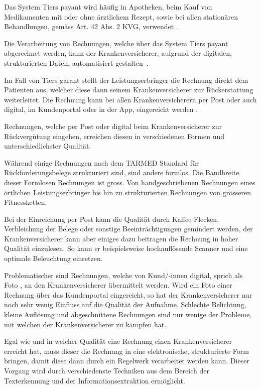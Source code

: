 Das System Tiers payant wird häufig in Apotheken, beim Kauf von Medikamenten mit oder ohne ärztlichem Rezept, sowie bei allen stationären Behandlungen, gemäss Art. 42 Abs. 2 KVG, verwendet \autocite{EDI2017}.

Die Verarbeitung von Rechnungen, welche über das System Tiers payant abgerechnet werden, kann der Krankenversicherer, aufgrund der digitalen, strukturierten Daten, automatisiert gestalten~\autocite{BAG2016}.

Im Fall von Tiers garant stellt der Leistungserbringer die Rechnung direkt dem Patienten aus, welcher diese dann seinem Krankenversicherer zur Rückerstattung weiterleitet. Die Rechnung kann bei allen Krankenversicherern per Post oder auch digital, im Kundenportal oder in der App, eingereicht werden \autocite{EDI2017}.

Rechnungen, welche per Post oder digital beim Krankenversicherer zur Rückvergütung eingehen, erreichen diesen in verschiedenen Formen und unterschiedlichster Qualität. 

Während einige Rechnungen nach dem TARMED Standard für Rückforderungsbelege strukturiert sind, sind andere formlos. Die Bandbreite dieser Formlosen Rechnungen ist gross. Von handgeschriebenen Rechnungen eines örtlichen Leistungserbringer bis hin zu strukturierten Rechnungen von grösseren Fitnessketten.

Bei der Einreichung per Post kann die Qualität durch Kaffee-Flecken, Verbleichung der Belege oder sonstige Beeinträchtigungen gemindert werden, der Krankenversicherer kann aber einiges dazu beitragen die Rechnung in hoher Qualität einzulesen. So kann er beispielsweise hochauflösende Scanner und eine optimale Beleuchtung einsetzen.

Problematischer sind Rechnungen, welche von Kund/-innen digital, sprich als Foto , an den Krankenversicherer übermittelt werden. Wird ein Foto einer Rechnung über das Kundenportal eingereicht, so hat der Krankenversicherer nur noch sehr wenig Einfluss auf die Qualität der Aufnahme. Schlechte Belichtung, kleine Auflösung und abgeschnittene Rechnungen sind nur wenige der Probleme, mit welchen der Krankenversicherer zu kämpfen hat.

Egal wie und in welcher Qualität eine Rechnung einen Krankenversicherer erreicht hat, muss dieser die Rechnung in eine elektronische, strukturierte Form bringen, damit diese dann durch ein Regelwerk verarbeitet werden kann. Dieser Vorgang wird durch verschiedenste Techniken aus dem Bereich der Texterkennung und der Informationsextraktion ermöglicht.

